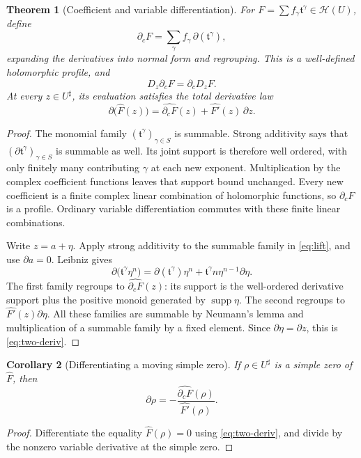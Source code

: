 \documentclass[11pt,a4paper]{article}
\numberwithin{equation}{section}
\newtheorem{theorem}{Theorem}[section]
\newtheorem{corollary}[theorem]{Corollary}
\theoremstyle{definition}
\newcommand{\tmon}{\mathfrak t}
\newcommand{\HH}{\mathscr H}
\newcommand{\supp}{\operatorname{supp}}
\newcommand{\hhat}[1]{\widehat{#1}}
\begin{document}
\begin{theorem}[Coefficient and variable differentiation]\label{thm:twoderiv}
For $F=\sum f_\gamma\tmon^\gamma\in\HH(U)$, define
\[
 \partial_cF=\sum_\gamma f_\gamma\,\partial(\tmon^\gamma),
\]
expanding the derivatives into normal form and regrouping. This is a
well-defined holomorphic profile, and
\[
 D_z\partial_cF=\partial_cD_zF.
\]
At every $z\in U^\sharp$, its evaluation satisfies the total derivative law
\begin{equation}\label{eq:two-deriv}
 \partial\bigl(\hhat F(z)\bigr)
   =\hhat{\partial_cF}(z)+\hhat{F'}(z)\,\partial z.
\end{equation}
\end{theorem}
\begin{proof}
The monomial family $(\tmon^\gamma)_{\gamma\in S}$ is summable. Strong
additivity says that $(\partial\tmon^\gamma)_{\gamma\in S}$ is summable as
well. Its joint support is therefore well ordered, with only finitely many
contributing $\gamma$ at each new exponent. Multiplication by the complex
coefficient functions leaves that support bound unchanged. Every new
coefficient is a finite complex linear combination of holomorphic functions,
so $\partial_cF$ is a profile. Ordinary variable differentiation commutes
with these finite linear combinations.

Write $z=a+\eta$. Apply strong additivity to the summable family in
\eqref{eq:lift}, and use $\partial a=0$. Leibniz gives
\[
 \partial\bigl(\tmon^\gamma\eta^n\bigr)
   =\partial(\tmon^\gamma)\eta^n
       +\tmon^\gamma n\eta^{n-1}\partial\eta.
\]
The first family regroups to $\hhat{\partial_cF}(z)$: its support is the
well-ordered derivative support plus the positive monoid generated by
$\supp\eta$. The second regroups to $\hhat{F'}(z)\partial\eta$.
All these families are summable by Neumann's lemma and multiplication of a
summable family by a fixed element. Since $\partial\eta=\partial z$, this
is \eqref{eq:two-deriv}.
\end{proof}

\begin{corollary}[Differentiating a moving simple zero]
If $\rho\in U^\sharp$ is a simple zero of $\hhat F$, then
\[
 \partial\rho=-\frac{\hhat{\partial_cF}(\rho)}{\hhat{F'}(\rho)}.
\]
\end{corollary}
\begin{proof}
Differentiate the equality $\hhat F(\rho)=0$ using \eqref{eq:two-deriv},
and divide by the nonzero variable derivative at the simple zero.
\end{proof}
\end{document}
